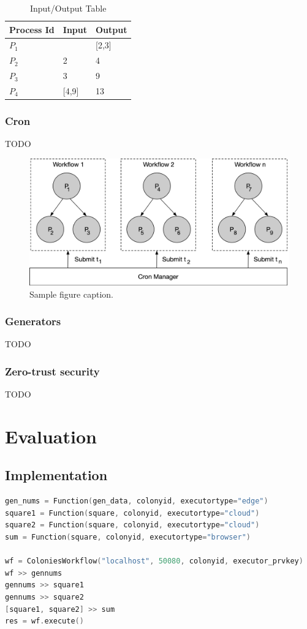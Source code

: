 \documentclass{article}
\begin{document}
\begin{table}[h]
	\caption{Input/Output Table}
	\centering
	\begin{tabular}{lll}
		\toprule
		\cmidrule(r){1-2}
        Process Id & Input & Output \\
		\midrule
        $P_{1}$    & & [2,3] \\
        $P_{2}$    & 2 & 4 \\
        $P_{3}$    & 3 & 9 \\
        $P_{4}$    & [4,9] & 13 \\
		\bottomrule
	\end{tabular}
	\label{tab:table}
\end{table}

\subsubsection{Cron}
TODO
\begin{figure}[h]
	\centering
    \includegraphics[scale=0.4]{cron.png}
	\caption{Sample figure caption.}
	\label{fig:fig1}
\end{figure}

\subsubsection{Generators}
TODO

\subsubsection{Zero-trust security}
TODO

\section{Evaluation}
\subsection{Implementation}
\begin{lstlisting}[language=c]
gen_nums = Function(gen_data, colonyid, executortype="edge")
square1 = Function(square, colonyid, executortype="cloud")
square2 = Function(square, colonyid, executortype="cloud")
sum = Function(square, colonyid, executortype="browser")

wf = ColoniesWorkflow("localhost", 50080, colonyid, executor_prvkey)
wf >> gennums
gennums >> square1
gennums >> square2
[square1, square2] >> sum
res = wf.execute()
\end{lstlisting}
\end{document}
